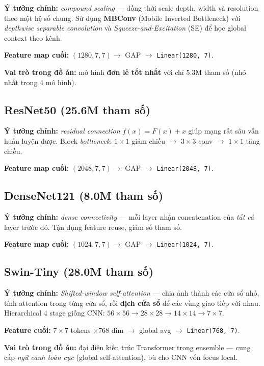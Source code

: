 \documentclass[11pt,a4paper]{article}
\begin{document}
\textbf{Ý tưởng chính:} \textit{compound scaling} --- đồng thời scale depth, width và resolution theo một hệ số chung. Sử dụng \textbf{MBConv} (Mobile Inverted Bottleneck) với \textit{depthwise separable convolution} và \textit{Squeeze-and-Excitation} (SE) để học global context theo kênh.

\textbf{Feature map cuối:} $(1280, 7, 7) \to$ GAP $\to$ \texttt{Linear(1280, 7)}.

\textbf{Vai trò trong đồ án:} mô hình \textbf{đơn lẻ tốt nhất} với chỉ 5.3M tham số (nhỏ nhất trong 4 mô hình).

\subsection{ResNet50 (25.6M tham số)}

\textbf{Ý tưởng chính:} \textit{residual connection} $f(x) = F(x) + x$ giúp mạng rất sâu vẫn huấn luyện được. Block \textit{bottleneck}: $1 \times 1$ giảm chiều $\to$ $3 \times 3$ conv $\to$ $1 \times 1$ tăng chiều.

\textbf{Feature map cuối:} $(2048, 7, 7) \to$ GAP $\to$ \texttt{Linear(2048, 7)}.

\subsection{DenseNet121 (8.0M tham số)}

\textbf{Ý tưởng chính:} \textit{dense connectivity} --- mỗi layer nhận concatenation của \textit{tất cả} layer trước đó. Tận dụng feature reuse, giảm số tham số.

\textbf{Feature map cuối:} $(1024, 7, 7) \to$ GAP $\to$ \texttt{Linear(1024, 7)}.

\subsection{Swin-Tiny (28.0M tham số)}

\textbf{Ý tưởng chính:} \textit{Shifted-window self-attention} --- chia ảnh thành các cửa sổ nhỏ, tính attention trong từng cửa sổ, rồi \textbf{dịch cửa sổ} để các vùng giao tiếp với nhau. Hierarchical 4 stage giống CNN: $56 \times 56 \to 28 \times 28 \to 14 \times 14 \to 7 \times 7$.

\textbf{Feature cuối:} $7 \times 7$ tokens $\times 768$ dim $\to$ global avg $\to$ \texttt{Linear(768, 7)}.

\textbf{Vai trò trong đồ án:} đại diện kiến trúc Transformer trong ensemble --- cung cấp \textit{ngữ cảnh toàn cục} (global self-attention), bù cho CNN vốn focus local.
\end{document}
